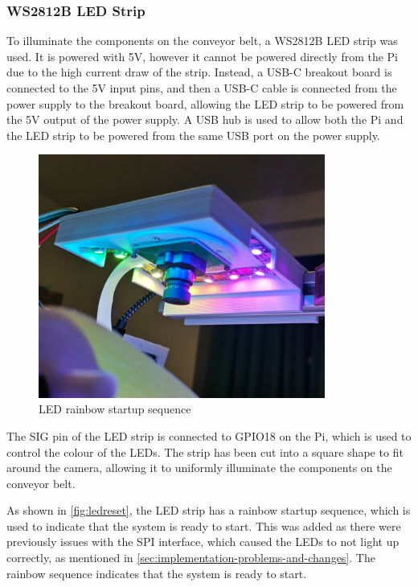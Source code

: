 \subsubsection{WS2812B LED Strip}
\label{sec:ws2812b-led-strip}
To illuminate the components on the conveyor belt, a WS2812B LED strip was used. It is powered with 5V, however it cannot be powered directly from the Pi due to the high current draw of the strip. Instead, a USB-C breakout board is connected to the 5V input pins, and then a USB-C cable is connected from the power supply to the breakout board, allowing the LED strip to be powered from the 5V output of the power supply. A USB hub is used to allow both the Pi and the LED strip to be powered from the same USB port on the power supply.

\begin{figure}[H]
  \hfill
  \begin{minipage}[t]{\textwidth}
    \centering
    \includegraphics[height=8cm]{imgs/real/ws2812.jpeg}
    \caption{LED rainbow startup sequence}
    \label{fig:ledreset}
  \end{minipage}
\end{figure}

The SIG pin of the LED strip is connected to GPIO18 on the Pi, which is used to control the colour of the LEDs. The strip has been cut into a square shape to fit around the camera, allowing it to uniformly illuminate the components on the conveyor belt.

As shown in \autoref{fig:ledreset}, the LED strip has a rainbow startup sequence, which is used to indicate that the system is ready to start. This was added as there were previously issues with the SPI interface, which caused the LEDs to not light up correctly, as mentioned in \autoref{sec:implementation-problems-and-changes}. The rainbow sequence indicates that the system is ready to start.
